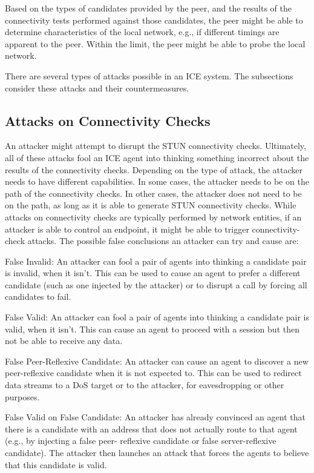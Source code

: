 \documentclass{article}
\begin{document}
Based on the types of candidates provided by the peer, and the results of the connectivity tests performed against those candidates, the peer might be able to determine characteristics of the local network, e.g., if different timings are apparent to the peer.  Within the limit, the peer might be able to probe the local network.

There are several types of attacks possible in an ICE system.  The subsections consider these attacks and their countermeasures.

\subsection{Attacks on Connectivity Checks}

An attacker might attempt to disrupt the STUN connectivity checks. Ultimately, all of these attacks fool an ICE agent into thinking something incorrect about the results of the connectivity checks. Depending on the type of attack, the attacker needs to have different capabilities.  In some cases, the attacker needs to be on the path of the connectivity checks.  In other cases, the attacker does not need to be on the path, as long as it is able to generate STUN connectivity checks.  While attacks on connectivity checks are typically performed by network entities, if an attacker is able to control an endpoint, it might be able to trigger connectivity-check attacks.  The possible false conclusions an attacker can try and cause are:

False Invalid:  An attacker can fool a pair of agents into thinking a candidate pair is invalid, when it isn't.  This can be used to cause an agent to prefer a different candidate (such as one injected by the attacker) or to disrupt a call by forcing all candidates to fail.

False Valid:  An attacker can fool a pair of agents into thinking a candidate pair is valid, when it isn't.  This can cause an agent to proceed with a session but then not be able to receive any data.

False Peer-Reflexive Candidate:  An attacker can cause an agent to discover a new peer-reflexive candidate when it is not expected to.  This can be used to redirect data streams to a DoS target or to the attacker, for eavesdropping or other purposes.

False Valid on False Candidate:  An attacker has already convinced an agent that there is a candidate with an address that does not actually route to that agent (e.g., by injecting a false peer- reflexive candidate or false server-reflexive candidate).  The attacker then launches an attack that forces the agents to believe that this candidate is valid.
\end{document}
